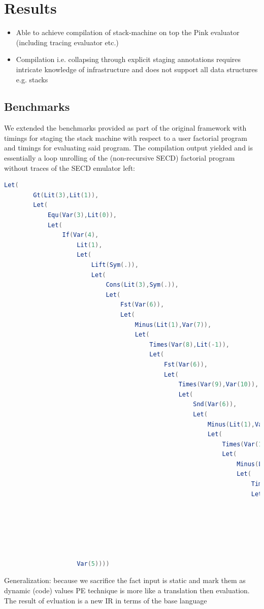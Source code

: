 \documentclass[fleqn]{article}
\theoremstyle{definition}
\begin{document}
\section{Results}
\begin{itemize}
	\item Able to achieve compilation of stack-machine on top the Pink evaluator (including tracing evaluator etc.)
	\item Compilation i.e. collapsing through explicit staging annotations requires intricate knowledge of infrastructure and does not support all data structures e.g. stacks
\end{itemize}

\subsection{Benchmarks}
We extended the benchmarks provided as part of the original framework \cite{amin2017collapsing} with timings for staging the stack machine with respect to a user factorial program and timings for evaluating said program.
The compilation output yielded and is essentially a loop unrolling of the (non-recursive SECD) factorial program without traces of the SECD emulator left:
\begin{lstlisting}[language=Scala]
	Let(
		Gt(Lit(3),Lit(1)),
		Let(
			Equ(Var(3),Lit(0)),
			Let(
				If(Var(4),
					Lit(1),
					Let(
						Lift(Sym(.)),
						Let(
							Cons(Lit(3),Sym(.)),
							Let(
								Fst(Var(6)),
								Let(
									Minus(Lit(1),Var(7)),
									Let(
										Times(Var(8),Lit(-1)),
										Let(
											Fst(Var(6)),
											Let(
												Times(Var(9),Var(10)),
												Let(
													Snd(Var(6)),
													Let(
														Minus(Lit(1),Var(7)),
														Let(
															Times(Var(13),Lit(-1)),
															Let(
																Minus(Lit(1),Var(14)),
																Let(
																	Times(Var(15),Lit(-1)),
																	Let(
																		Times(Var(16),Var(11)),
																		Let(
																			Minus(Lit(1),Var(14)),
																			Let(
																				Times(Var(18),Lit(-1)),
																				Var(17))))))))))))))))),
					Var(5))))
\end{lstlisting}
Generalization: because we sacrifice the fact input is static and mark them as dynamic (code) values
PE technique is more like a translation then evaluation. The result of evluation is a new IR in terms of the base language
\end{document}
